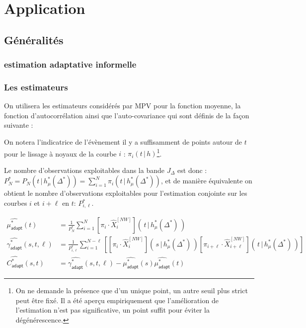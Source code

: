 \chapter{
  Application
 }
\minitoc%

\section{Généralités}

\subsection{estimation adaptative informelle}

\subsection{Les estimateurs}


On utilisera les estimateurs considérés par MPV \cite{maissoro-SmoothnessFTSweakDep} pour la fonction moyenne, la fonction d'autocorrélation ainsi que l'auto-covariance qui sont définis de la façon suivante :

On notera l'indicatrice de l'évènement \og il y a suffisamment de points autour de $t$ pour le lissage à noyaux de la courbe $i$ \fg : $\pi_i(t \, | \, h)$\footnote{On ne demande la présence que d'un unique point, un autre seuil plus strict peut être fixé. Il a été aperçu empiriquement que l'amélioration de l'estimation n'est pas significative, un point suffit pour éviter la dégénérescence.}.

Le nombre d'observations exploitables dans la bande $J_\Delta$ est donc : $P_N^* =P_N(t \, | \, h_\mu^*(\Delta^*)) = \sum\limits_{i=1}^N \pi_i(t \, | \, h_\mu^*(\Delta^*))$, et de manière équivalente on obtient le nombre d'observations exploitables pour l'estimation conjointe sur les courbes $i$ et $i + \ell$ en $t$: $P_{i,\ell}^*$.

\begin{align}
\widehat{\mu^*_{\textsf{adapt}}}(t)     &= \frac 1 {P_N^*} \sum_{i=1}^N \left[\pi_i \cdot \widehat X^{[NW]}_i\right]\left(\, t \, | \, h^*_\mu(\Delta^*) \, \right)\\
\widehat {\gamma^*_{\textsf{adapt}}}(s, t, \ell) &= \frac 1 {P^*_{i, \ell}}\sum_{i=1}^{N- \ell} \left[
\left[\pi_i \cdot \widehat X^{[NW]}_i\right]\left(\, s \, | \, h^*_\mu(\Delta^*) \, \right) \left[\pi_{i + \ell} \cdot \widehat X^{[NW]}_{i + \ell}\right]\left(\, t \, | \, h^*_\mu(\Delta^*) \, \right)
 \right]  \\
\widehat {C^*_{\textsf{adapt}}}(s,t)     &= \widehat {\gamma^*_{\textsf{adapt}}}(s, t, \ell) -
\widehat{\mu^*_{\textsf{adapt}}}(s)\widehat{\mu^*_{\textsf{adapt}}}(t)
\end{align}

